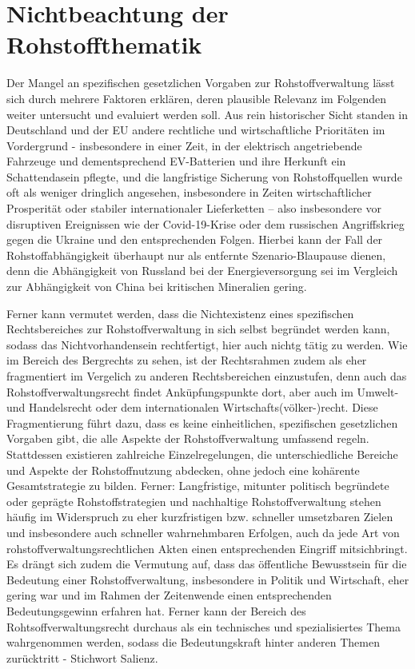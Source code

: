 \documentclass[12pt,a4paper,oneside]{book} %
\begin{document}
\section{Nichtbeachtung der Rohstoffthematik}
Der Mangel an spezifischen gesetzlichen Vorgaben zur Rohstoffverwaltung lässt sich durch mehrere Faktoren erklären, deren plausible Relevanz im Folgenden weiter untersucht und evaluiert werden soll. Aus rein historischer Sicht standen in Deutschland und der EU andere rechtliche und wirtschaftliche Prioritäten im Vordergrund - insbesondere in einer Zeit, in der elektrisch angetriebende Fahrzeuge und dementsprechend EV-Batterien und ihre Herkunft ein Schattendasein pflegte, und die langfristige Sicherung von Rohstoffquellen wurde oft als weniger dringlich angesehen, insbesondere in Zeiten wirtschaftlicher Prosperität oder stabiler internationaler Lieferketten – also insbesondere vor disruptiven Ereignissen wie der Covid-19-Krise oder dem russischen Angriffskrieg gegen die Ukraine und den entsprechenden Folgen. Hierbei kann der Fall der Rohstoffabhängigkeit überhaupt nur als entfernte Szenario-Blaupause dienen, denn die Abhängigkeit von Russland bei der Energieversorgung sei im Vergleich zur Abhängigkeit von China bei kritischen Mineralien gering.\autocite{Rachman, FT}


Ferner kann vermutet werden, dass die Nichtexistenz eines spezifischen Rechtsbereiches zur Rohstoffverwaltung in sich selbst begründet werden kann, sodass das Nichtvorhandensein rechtfertigt, hier auch nichtg tätig zu werden. Wie im Bereich des Bergrechts zu sehen, ist der Rechtsrahmen zudem als eher fragmentiert im Vergelich zu anderen Rechtsbereichen einzustufen, denn auch das Rohstoffverwaltungsrecht findet Anküpfungspunkte dort, aber auch im Umwelt- und Handelsrecht oder dem internationalen Wirtschafts(völker-)recht. Diese Fragmentierung führt dazu, dass es keine einheitlichen, spezifischen gesetzlichen Vorgaben gibt, die alle Aspekte der Rohstoffverwaltung umfassend regeln. Stattdessen existieren zahlreiche Einzelregelungen, die unterschiedliche Bereiche und Aspekte der Rohstoffnutzung abdecken, ohne jedoch eine kohärente Gesamtstrategie zu bilden.
Ferner: Langfristige, mitunter politisch begründete oder geprägte Rohstoffstrategien und nachhaltige Rohstoffverwaltung stehen häufig im Widerspruch zu eher kurzfristigen bzw. schneller umsetzbaren Zielen und insbesondere auch schneller wahrnehmbaren Erfolgen, auch da jede Art von rohstoffverwaltungsrechtlichen Akten einen entsprechenden Eingriff mitsichbringt. 
Es drängt sich zudem die Vermutung auf, dass das öffentliche Bewusstsein für die Bedeutung einer Rohstoffverwaltung, insbesondere in Politik und Wirtschaft, eher gering war und im Rahmen der Zeitenwende einen entsprechenden Bedeutungsgewinn erfahren hat. Ferner kann der Bereich des Rohtsoffverwaltungsrecht durchaus als ein technisches und spezialisiertes Thema wahrgenommen werden, sodass die Bedeutungskraft hinter anderen Themen zurücktritt - Stichwort Salienz.
\end{document}
